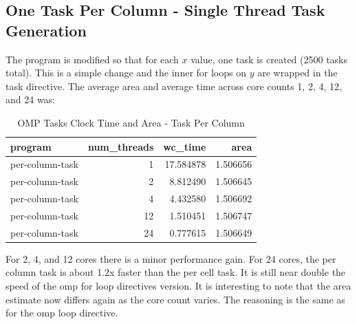 \documentclass{article}
\begin{document}
\subsection{One Task Per Column - Single Thread Task Generation}
The program is modified so that for each $x$ value, one task is created (2500 tasks total). This is a simple change 
and the inner for loops on $y$ are wrapped in the task directive. The average area and average time across core counts 1, 2, 4, 12, and 24 was:
\begin{table}[H]
    \centering
    \caption{OMP Tasks Clock Time and Area - Task Per Column}
    \fontsize{12}{14}\selectfont
    \begin{tabular}[t]{l|r|r|r}
    \hline
    program & num\_threads & wc\_time & area\\
    \hline
    per-column-task & 1 & 17.584878 & 1.506656\\
    \hline
    per-column-task & 2 & 8.812490 & 1.506645\\
    \hline
    per-column-task & 4 & 4.432580 & 1.506692\\
    \hline
    per-column-task & 12 & 1.510451 & 1.506747\\
    \hline
    per-column-task & 24 & 0.777615 & 1.506649\\
    \hline
    \end{tabular}
\end{table}
\noindent For 2, 4, and 12 cores there is a minor performance gain. For 24 cores, the per column 
task is about 1.2x faster than the per cell task. It is still near double the speed of 
the omp for loop directives version. It is interesting to note that the area estimate now 
differs again as the core count varies. The reasoning is the same as for the omp loop directive.
\end{document}
